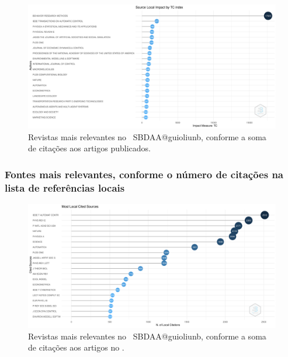 \begin{figure}
    \centering
    \includegraphics[width=1\textwidth]{experiments/jhcf/PesqBibliogr/SimulacaoMultiagente/WoS-20220203/Metricas/Sources/MASSA2-Total-Citation-Source-Local-Impact.png.png}
    \caption{Revistas mais relevantes no  \dataset\ SBDAA@guioliunb, conforme a soma de citações aos artigos publicados.}
    \label{fig:MASSA2-Total-Citation-Source-Local-Impact.png}
\end{figure}

\subsubsection{Fontes mais relevantes, conforme o número de citações na lista de referências locais}

\begin{figure}
    \centering
    \includegraphics[width=1\textwidth]{experiments/jhcf/PesqBibliogr/SimulacaoMultiagente/WoS-20220203/Metricas/Sources/MASSA2-Most-Local-Cited-Sources(from-Reference-Lists).png}
    \caption{Revistas mais relevantes no  \dataset\ SBDAA@guioliunb, conforme a soma de citações aos artigos no \dataset.}
    \label{fig:MASSA2-Most-Local-Cited-Sources(from-Reference-Lists).png}
\end{figure}

